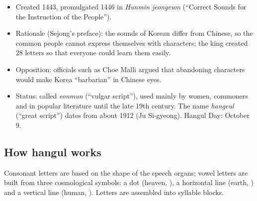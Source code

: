 \begin{important}
\begin{itemize}
  \item Created 1443, promulgated 1446 in \emph{Hunmin jeongeum} (``Correct Sounds for the
        Instruction of the People'').
  \item Rationale (Sejong's preface): the sounds of Korean differ from Chinese, so the
        common people cannot express themselves with characters; the king created 28
        letters so that everyone could learn them easily.
  \item Opposition: officials such as Choe Malli argued that abandoning characters would
        make Korea ``barbarian'' in Chinese eyes.
  \item Status: called \emph{eonmun} (``vulgar script''), used mainly by women, commoners
        and in popular literature until the late 19th century. The name \emph{hangeul}
        (``great script'') dates from about 1912 (Ju Si-gyeong). Hangul Day: October 9.
\end{itemize}
\end{important}

\subsection{How hangul works}

Consonant letters are based on the shape of the speech organs; vowel letters are built from
three cosmological symbols: a dot (heaven, ), a horizontal line (earth, ) and a
vertical line (human, ). Letters are assembled into syllable blocks.

\begin{center}
\end{center}

